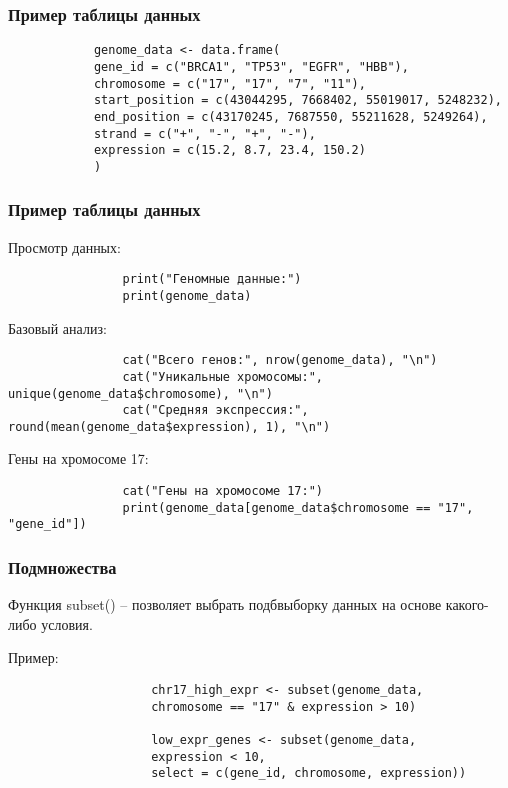 \documentclass[10pt]{beamer}
\begin{document}
	\begin{frame}[fragile]
		
		
		\frametitle{Пример таблицы данных}
		
		\begin{verbatim}
			genome_data <- data.frame(
			gene_id = c("BRCA1", "TP53", "EGFR", "HBB"),
			chromosome = c("17", "17", "7", "11"),
			start_position = c(43044295, 7668402, 55019017, 5248232),
			end_position = c(43170245, 7687550, 55211628, 5249264),
			strand = c("+", "-", "+", "-"),
			expression = c(15.2, 8.7, 23.4, 150.2)
			)
		\end{verbatim}	
	\end{frame}
	
	\begin{frame}[fragile]
		\frametitle{Пример таблицы данных}
		\begin{exampleblock}{Просмотр данных:}
			\begin{verbatim}
				print("Геномные данные:")
				print(genome_data)
			\end{verbatim}
		\end{exampleblock}
		
		\begin{exampleblock}{Базовый анализ:}
			\begin{verbatim}
				cat("Всего генов:", nrow(genome_data), "\n")
				cat("Уникальные хромосомы:", unique(genome_data$chromosome), "\n")
				cat("Средняя экспрессия:", round(mean(genome_data$expression), 1), "\n")
			\end{verbatim}
		\end{exampleblock}
		
		\begin{exampleblock}{Гены на хромосоме 17:}
			\begin{verbatim}
				cat("Гены на хромосоме 17:")
				print(genome_data[genome_data$chromosome == "17", "gene_id"])
			\end{verbatim}
		\end{exampleblock}
	\end{frame}
	
	\begin{frame}[fragile]
		\frametitle{Подмножества}
		Функция subset() – позволяет выбрать подбвыборку данных на основе какого-либо условия.
		{\fontsize{8}{9}\selectfont
			\begin{exampleblock}{Пример:}
				\begin{verbatim}
					chr17_high_expr <- subset(genome_data, 
					chromosome == "17" & expression > 10)
					
					low_expr_genes <- subset(genome_data, 
					expression < 10, 
					select = c(gene_id, chromosome, expression))\end{verbatim}
			\end{exampleblock}
		}
		
		
	\end{frame}
	
\end{document}
